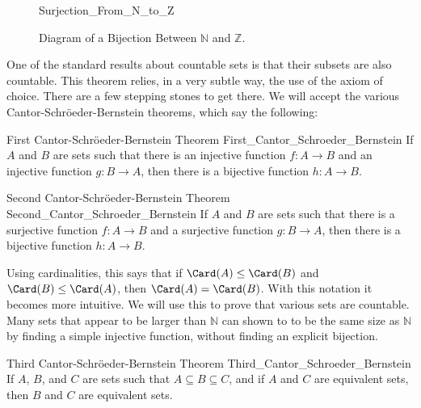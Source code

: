 \documentclass[crop=false,class=book,oneside]{standalone}
\begin{document}
            \begin{figure}[H]
                \centering
                \captionsetup{type=figure}
                {Surjection_From_N_to_Z}
                \caption{Diagram of a Bijection Between
                         $\mathbb{N}$ and $\mathbb{Z}$.}
                \label{fig:Bijection_N_and_Z}
            \end{figure}
            One of the standard results about countable sets is
            that their subsets are also countable. This theorem
            relies, in a very subtle way, the use of the axiom
            of choice. There are a few stepping stones to get
            there. We will accept the various
            Cantor-Schr\"{o}eder-Bernstein theorems, which say
            the following:
            \begin{ltheorem}
                  {First Cantor-Schr\"{o}eder-Bernstein Theorem}
                  {First_Cantor_Schroeder_Bernstein}
                If $A$ and $B$ are sets such that there is an injective
                function $f:A\rightarrow{B}$ and an injective function
                $g:B\rightarrow{A}$, then there is a bijective function
                $h:A\rightarrow{B}$.
            \end{ltheorem}
            \begin{ltheorem}
                  {Second Cantor-Schr\"{o}eder-Bernstein Theorem}
                  {Second_Cantor_Schroeder_Bernstein}
                If $A$ and $B$ are sets such that there is a surjective
                function $f:A\rightarrow{B}$ and a surjective function
                $g:B\rightarrow{A}$, then there is a bijective function
                $h:A\rightarrow{B}$.
            \end{ltheorem}
            \par\hfill\par
            Using cardinalities, this says that if
            $\Card(A)\leq\Card(B)$ and $\Card(B)\leq\Card(A)$, then
            $\Card(A)=\Card(B)$. With this notation it becomes more
            intuitive. We will use this to prove that various sets are
            countable. Many sets that appear to be larger than $\mathbb{N}$
            can shown to to be the same size as $\mathbb{N}$ by finding
            a simple injective function, without finding an explicit
            bijection.
            \begin{ltheorem}
                  {Third Cantor-Schr\"{o}eder-Bernstein Theorem}
                  {Third_Cantor_Schroeder_Bernstein}
                If $A$, $B$, and $C$ are sets such that
                $A\subseteq{B}\subseteq{C}$, and if $A$ and $C$ are equivalent
                sets, then $B$ and $C$ are equivalent sets.
            \end{ltheorem}
\end{document}
